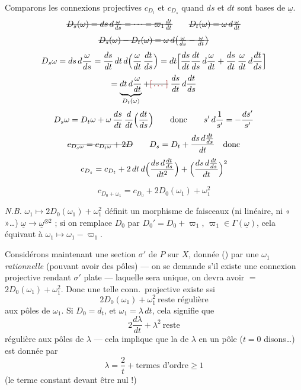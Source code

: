 \documentclass[11pt,a4paper]{article}
\begin{document}
Comparons les connexions projectives $c_{D_t}$ et $c_{D_s}$ quand $ds$ et $dt$ sont bases de $\underline{\omega}$.
\[
\text{\struck{$D_s(\omega)=ds\,d\frac{\omega}{ds}=\dots=\varpi_1\frac{dt}{dt}$}}
\qquad
\text{\struck{$D_t(\omega)=\omega\,d\frac{\omega}{dt}$}}
\]
\[
\text{\struck{$D_s(\omega)-D_t(\omega)=\omega\,d\bigl(\frac{\omega}{ds}-\frac{\omega}{dt}\bigr)$}}
\]
\[
D_s\omega=ds\,d\frac{\omega}{ds}=\frac{ds}{dt}\,dt\,d\Bigl(\frac{\omega}{dt}\,\frac{dt}{ds}\Bigr)
=dt\Bigl[\frac{ds}{dt}\frac{dt}{ds}\,d\frac{\omega}{dt}+\frac{ds}{dt}\,\frac{\omega}{dt}\,d\frac{dt}{ds}\Bigr]
\]
\[
=\underbrace{dt\,d\frac{\omega}{dt}}_{D_t(\omega)}+\text{\struck{\ill{}}}\;\frac{ds}{dt}\,d\frac{dt}{ds}
\]
\[
D_s\omega=D_t\omega+\omega\,\frac{ds}{dt}\,\frac{d}{dt}\Bigl(\frac{dt}{ds}\Bigr)\qquad\text{donc}\qquad
s'\,d\frac{1}{s'}=-\frac{ds'}{s'}
\]
\[
\text{\struck{$c_{D_s\omega}=c_{D_t\omega}+2D$}}\qquad
D_s=D_t+\frac{ds\,d\frac{dt}{ds}}{dt}\quad\text{donc}
\]
\[
c_{D_s}=c_{D_t}+2\,dt\,d\Bigl(\frac{ds\,d\frac{dt}{ds}}{dt^2}\Bigr)+\Bigl(\frac{ds\,d\frac{dt}{ds}}{dt}\Bigr)^2
\]

\[
c_{D_0+\omega_1}=c_{D_0}+2D_0(\omega_1)+\omega_1^2
\]

\emph{N.B.} $\omega_1\mapsto 2D_0(\omega_1)+\omega_1^2$ définit un morphisme de faisceaux (ni linéaire, ni «  »…) $\underline{\omega}\to\underline{\omega}^{\otimes2}$ ; si on remplace $D_0$ par $D_0'=D_0+\varpi_1$, $\varpi_1\in\Gamma(\underline{\omega})$, cela équivaut à $\omega_1\mapsto\omega_1-\varpi_1$.

Considérons maintenant une section $\sigma'$ de $P$ sur $X$, donnée () par une $\omega_1$ \emph{rationnelle} (pouvant avoir des pôles) — on se demande s'il existe une connexion projective rendant $\sigma'$ plate — laquelle sera unique, on devra avoir  $=$  \ill{} $2D_0(\omega_1)+\omega_1^2$. Donc une telle conn.\ projective existe ssi
\[
2D_0(\omega_1)+\omega_1^2\ \text{reste régulière}
\]
aux pôles de $\omega_1$. Si $D_0=d_t$, et $\omega_1=\lambda\,dt$, cela signifie que
\[
2\frac{d\lambda}{dt}+\lambda^2\ \text{reste}
\]
régulière aux pôles de $\lambda$ — cela implique que la  de $\lambda$ en un pôle ($t=0$ disons…) est donnée par
\[
\lambda=\frac{2}{t}+\text{termes d'ordre}\geqslant1
\]
(le terme constant devant être nul !)
\end{document}
